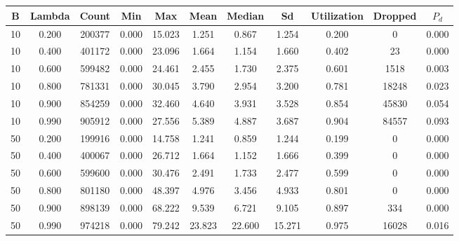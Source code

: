 \documentclass{article}
\begin{document}
\section{}
\begin{center}
\begin{tabular}{c | c | c | c | c | c | c | c | c | c | c}
	B         & Lambda    & Count     & Min       & Max       & Mean      & Median    & Sd        & Utilization & Dropped   & $P_d$     \\
	\hline
	10        & 0.200     & 200377    & 0.000     & 15.023    & 1.251     & 0.867     & 1.254     & 0.200     & 0         & 0.000     \\
	10        & 0.400     & 401172    & 0.000     & 23.096    & 1.664     & 1.154     & 1.660     & 0.402     & 23        & 0.000     \\
	10        & 0.600     & 599482    & 0.000     & 24.461    & 2.455     & 1.730     & 2.375     & 0.601     & 1518      & 0.003     \\
	10        & 0.800     & 781331    & 0.000     & 30.045    & 3.790     & 2.954     & 3.200     & 0.781     & 18248     & 0.023     \\
	10        & 0.900     & 854259    & 0.000     & 32.460    & 4.640     & 3.931     & 3.528     & 0.854     & 45830     & 0.054     \\
	10        & 0.990     & 905912    & 0.000     & 27.556    & 5.389     & 4.887     & 3.687     & 0.904     & 84557     & 0.093     \\
	50        & 0.200     & 199916    & 0.000     & 14.758    & 1.241     & 0.859     & 1.244     & 0.199     & 0         & 0.000     \\
	50        & 0.400     & 400067    & 0.000     & 26.712    & 1.664     & 1.152     & 1.666     & 0.399     & 0         & 0.000     \\
	50        & 0.600     & 599600    & 0.000     & 30.476    & 2.491     & 1.733     & 2.477     & 0.599     & 0         & 0.000     \\
	50        & 0.800     & 801180    & 0.000     & 48.397    & 4.976     & 3.456     & 4.933     & 0.801     & 0         & 0.000     \\
	50        & 0.900     & 898139    & 0.000     & 68.222    & 9.539     & 6.721     & 9.105     & 0.897     & 334       & 0.000     \\
	50        & 0.990     & 974218    & 0.000     & 79.242    & 23.823    & 22.600    & 15.271    & 0.975     & 16028     & 0.016     \\
\end{tabular} \\
\end{center}
\end{document}
